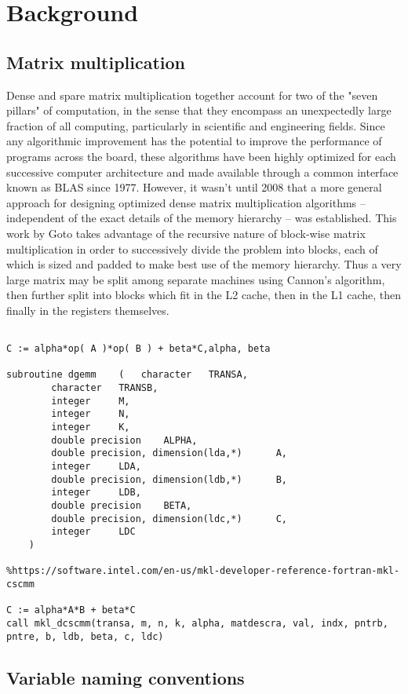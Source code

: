\chapter{Background}
\label{chapter:review}

\section{Matrix multiplication}

Dense and spare matrix multiplication together account for two of the "seven pillars" of computation, in the sense that they encompass an unexpectedly large fraction of all computing, particularly in scientific and engineering fields. Since any algorithmic improvement has the potential to improve the performance of programs across the board, these algorithms have been highly optimized for each successive computer architecture and made available through a common interface known as BLAS since 1977. However, it wasn't until 2008 that a more general approach for designing optimized dense matrix multiplication algorithms -- independent of the exact details of the memory hierarchy -- was established. This work by Goto takes advantage of the recursive nature of block-wise matrix multiplication in order to successively divide the problem into blocks, each of which is sized and padded to make best use of the memory hierarchy. Thus a very large matrix may be split among separate machines using Cannon's algorithm, then further split into blocks which fit in the L2 cache, then in the L1 cache, then finally in the registers themselves. 


\begin{verbatim}

C := alpha*op( A )*op( B ) + beta*C,alpha, beta

subroutine dgemm 	( 	character  	TRANSA,
		character  	TRANSB,
		integer  	M,
		integer  	N,
		integer  	K,
		double precision  	ALPHA,
		double precision, dimension(lda,*)  	A,
		integer  	LDA,
		double precision, dimension(ldb,*)  	B,
		integer  	LDB,
		double precision  	BETA,
		double precision, dimension(ldc,*)  	C,
		integer  	LDC 
	) 		

%https://software.intel.com/en-us/mkl-developer-reference-fortran-mkl-cscmm

C := alpha*A*B + beta*C
call mkl_dcscmm(transa, m, n, k, alpha, matdescra, val, indx, pntrb, pntre, b, ldb, beta, c, ldc)
\end{verbatim}

\section{Variable naming conventions}



